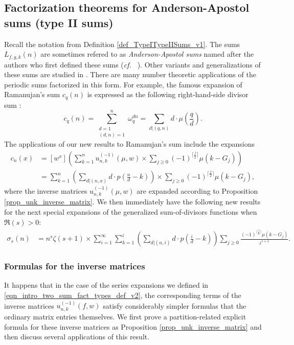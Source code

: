 \documentclass[12pt,reqno,a4letter]{article}
\numberwithin{figure}{section}
\numberwithin{table}{section}
\numberwithin{equation}{section}
\newcommand{\cf}{\textit{cf.~}}
\theoremstyle{plain}
\numberwithin{theorem}{section}
\theoremstyle{definition}
\begin{document}
\subsection{Factorization theorems for Anderson-Apostol sums (type II sums)}

Recall the notation from Definition \ref{def_TypeITypeIISums_v1}. 
The sums $L_{f,g,k}(n)$ are sometimes refered to as \emph{Anderson-Apostol sums} named 
after the authors who first defined these sums 
(\cf \cite[\S 8.3]{APOSTOLANUMT} \cite{APOSTOL-APGRS}). 
Other variants and generalizations of these sums are studied in \cite{IKEDA,KIUCHI-AVGS}. 
There are many number theoretic applications of the periodic sums factorized in this form. 
For example, the famous expansion of Ramanujan's sum $c_q(n)$ is expressed as the 
following right-hand-side divisor sum \cite[\S IX]{RAMANUJAN}: 
\[
c_q(n) = \sum_{\substack{d=1 \\ (d, n)=1}}^n 
     \omega_q^{dn} = \sum_{d|(q,n)} d \cdot \mu\left(\frac{q}{d}\right). 
\] 
The applications of our new results to Ramanujan's sum include the 
expansions 
\begin{align*} 
c_n(x) & = [w^{x}]\left(\sum_{k=1}^n u_{n,k}^{(-1)}(\mu, w) \times \sum_{j \geq 0} 
     (-1)^{\lceil \frac{j}{2} \rceil} \mu(k-G_j)\right) \\ 
     & = 
     \sum_{k=1}^n \left(\sum_{d|(n,x)} d \cdot p\left(\frac{n}{d}-k\right)\right) \times \sum_{j \geq 0} 
     (-1)^{\lceil \frac{j}{2} \rceil} \mu(k-G_j), 
\end{align*} 
where the inverse matrices $u_{n,k}^{(-1)}(\mu, w)$ 
are expanded according to Proposition \ref{prop_unk_inverse_matrix}. 
We then immediately have the following new results for the next special expansions of the 
generalized sum-of-divisors functions when $\Re(s) > 0$: 
\begin{align*} 
\sigma_s(n) & = n^s \zeta(s+1) \times \sum_{i=1}^{\infty} \sum_{k=1}^i \left(\sum_{d|(n,i)} 
     d \cdot p\left(\frac{i}{d}-k\right)\right) \sum_{j \geq 0} 
     \frac{(-1)^{\lceil \frac{j}{2} \rceil} \mu(k-G_j)}{i^{s+1}}. 
\end{align*}

\subsubsection{Formulas for the inverse matrices} 
\label{subSection_typeII_inv_matrices} 

It happens that in the case of the series expansions we defined in 
\eqref{eqn_intro_two_sum_fact_types_def_v2}, the 
corresponding terms of the inverse matrices $u_{n,k}^{(-1)}(f, w)$ 
satisfy considerably simpler formulas that the ordinary matrix entries themselves. 
We first prove a partition-related explicit formula for these inverse matrices as 
Proposition \ref{prop_unk_inverse_matrix} and 
then discuss several applications of this result. 
\end{document}
